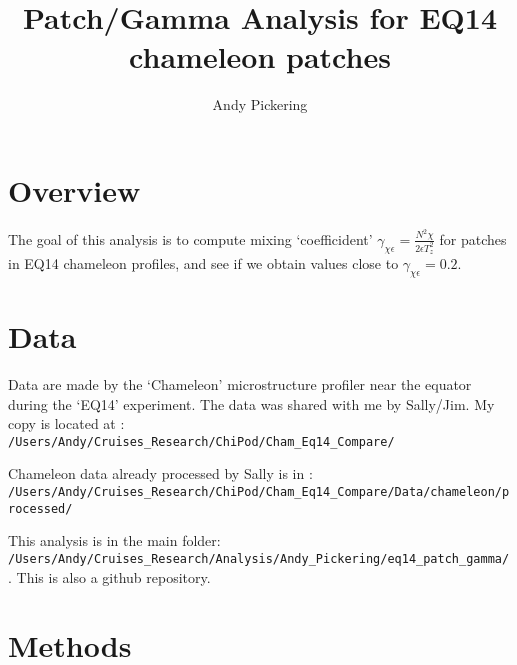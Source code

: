\documentclass[11pt]{article}
\title{Patch/Gamma Analysis for EQ14 chameleon patches}
\author{Andy Pickering}
\begin{document}
\maketitle

\tableofcontents
\newpage

\section{Overview}

The goal of this analysis is to compute mixing `coefficident' $\gamma_{\chi\epsilon}=\frac{N^2 \chi}{2\epsilon T_{z}^{2}} $ for patches in EQ14 chameleon profiles, and see if we obtain values close to $\gamma_{\chi\epsilon}=0.2$.

\section{Data}

Data are made by the `Chameleon' microstructure profiler near the equator during the `EQ14' experiment. The data was shared with me by Sally/Jim. My copy is located at : 
\newline
\verb+/Users/Andy/Cruises_Research/ChiPod/Cham_Eq14_Compare/+
\medskip

Chameleon data already processed by Sally is in : \newline
\verb+/Users/Andy/Cruises_Research/ChiPod/Cham_Eq14_Compare/Data/chameleon/processed/+

\medskip

This analysis is in the main folder: \newline  \verb+/Users/Andy/Cruises_Research/Analysis/Andy_Pickering/eq14_patch_gamma/+ . This is also a github repository.


\section{Methods}
\end{document}
